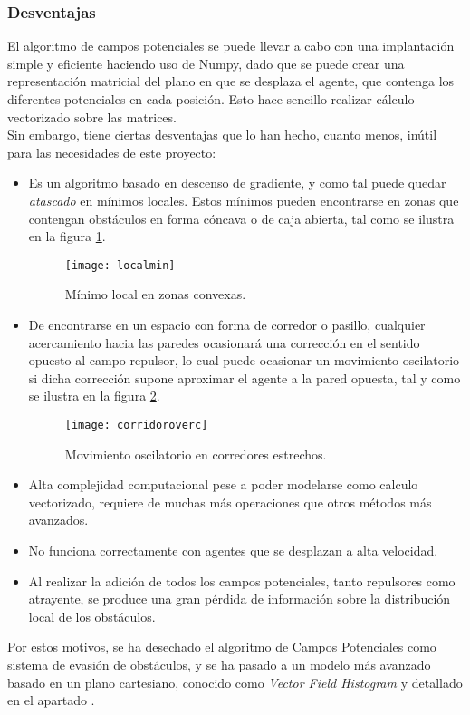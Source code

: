 \subsubsection{Desventajas}
El algoritmo de campos potenciales se puede llevar a cabo con una implantación simple y eficiente haciendo uso de Numpy, dado que se puede crear una representación matricial del plano en que se desplaza el agente, que contenga los diferentes potenciales en cada posición. 
Esto hace sencillo realizar cálculo vectorizado sobre las matrices. \\Sin embargo, tiene ciertas desventajas que lo han hecho, cuanto menos, inútil para las necesidades de este proyecto:
\begin{itemize}
\item Es un algoritmo basado en descenso de gradiente, y como tal puede quedar \textit{atascado} en mínimos locales. Estos mínimos pueden encontrarse en zonas que contengan obstáculos en forma cóncava o de caja abierta, tal como se ilustra en la figura \ref{fig:localmin}.
\begin{figure}[H]
	\centering
	\texttt{[image: localmin]}
	\caption{Mínimo local en zonas convexas.}\label{fig:localmin}
\end{figure}
\item De encontrarse en un espacio con forma de corredor o pasillo, cualquier acercamiento hacia las paredes ocasionará una corrección en el sentido opuesto al campo repulsor, lo cual puede ocasionar un movimiento oscilatorio si dicha corrección supone aproximar el agente a la pared opuesta, tal y como se ilustra en la figura \ref{fig:corridoroverc}.
\begin{figure}[H]
	\centering
	\texttt{[image: corridoroverc]}
	\caption{Movimiento oscilatorio en corredores estrechos.}\label{fig:corridoroverc}
\end{figure}
\item Alta complejidad computacional pese a poder modelarse como calculo vectorizado, requiere de muchas más operaciones que otros métodos más avanzados.
\item No funciona correctamente con agentes que se desplazan a alta velocidad. 
\item Al realizar la adición de todos los campos potenciales, tanto repulsores como atrayente, se produce una gran pérdida de información sobre la distribución local de los obstáculos.
\end{itemize} 

Por estos motivos, se ha desechado el algoritmo de Campos Potenciales como sistema de evasión de obstáculos, y se ha pasado a un modelo más avanzado basado en un plano cartesiano, conocido como \textit{Vector Field Histogram} y detallado en el apartado . 

